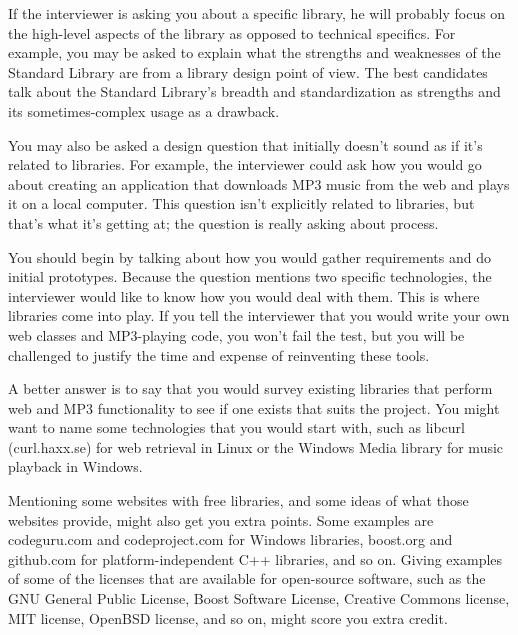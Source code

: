 If the interviewer is asking you about a specific library, he will probably focus on the high-level aspects of the library as opposed to technical specifics. For example, you may be asked to explain what the strengths and weaknesses of the Standard Library are from a library design point of view.
The best candidates talk about the Standard Library’s breadth and standardization as strengths and its sometimes-complex usage as a drawback.

You may also be asked a design question that initially doesn’t sound as if it’s related to libraries. For example, the interviewer could ask how you would go about creating an application that downloads MP3 music from the web and plays it on a local computer. This question isn’t explicitly related to libraries, but that’s what it’s getting at; the question is really asking about process.

You should begin by talking about how you would gather requirements and do initial prototypes. Because the question mentions two specific technologies, the interviewer would like to know how you would deal with them. This is where libraries come into play. If you tell the interviewer that you would write your own web classes and MP3-playing code, you won’t fail the test, but you will be challenged to justify the time and expense of reinventing these tools.

A better answer is to say that you would survey existing libraries that perform web and MP3 functionality to see if one exists that suits the project. You might want to name some technologies that you would start with, such as libcurl (curl.haxx.se) for web retrieval in Linux or the Windows Media library for music playback in Windows.

Mentioning some websites with free libraries, and some ideas of what those websites provide, might also get you extra points. Some examples are codeguru.com and codeproject.com for Windows libraries, boost.org and github.com for platform-independent C++ libraries, and so on. Giving examples of some of the licenses that are available for open-source software, such as the GNU General Public License, Boost Software License, Creative Commons license, MIT license, OpenBSD license, and so on, might score you extra credit.
